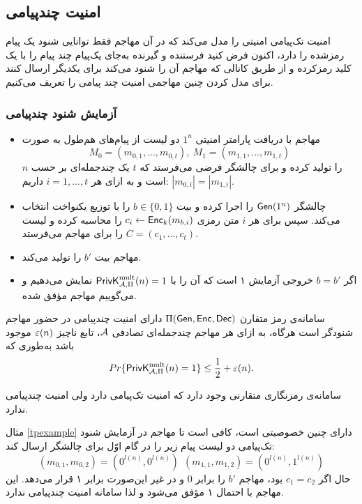 \subsection*{امنیت چند‌پیامی}
امنیت تک‌پیامی امنیتی را مدل می‌کند که در آن مهاجم فقط توانایی شنود یک پیام رمز‌شده را دارد، اکنون فرض کنید فرستنده و گیرنده به‌جای یک‌پیام چند پیام را با یک کلید رمز‌کرده و از طریق کانالی که مهاجم آن را شنود می‌کند برای یکدیگر ارسال کنند برای مدل کردن چنین مهاجمی امنیت چند پیامی را تعریف می‌کنیم.
\subsubsection*{آزمایش شنود چندپیامی}
\begin{itemize}
\item
مهاجم با دریافت پارامتر امنیتی 
$1^{n}$
 دو لیست از پیام‌های هم‌طول به صورت
 $$M_{0} = (m_{0,1}, ..., m_{0, t}), \ M_{1} = (m_{1, 1}, ..., m_{1, t})$$
را تولید کرده و برای چالشگر فرضی می‌فرستد که 
 $t$
 یک چندجمله‌ای بر حسب 
 $n$
  است و به ازای هر 
$i = 1,...,t$
داریم:
$|m_{0, i}|=|m_{1, i}|.$
\item
چالشگر 
$\mathsf{Gen}(1^n)$
را اجرا کرده و  بیت
$b\in\{0, 1\}$
را با توزیع یکنواخت انتخاب می‌کند. سپس  برای هر 
$i$
متن رمزی 
$c_{i}\leftarrow\mathsf{Enc}_{k}(m_{b, i})$
را محاسبه کرده و لیست 
$C = (c_{1}, ..., c_{t})$
را برای مهاجم می‌فرستد.
\item
مهاجم بیت 
$b'$
را تولید می‌کند.
\item
اگر 
$b = b'$
خروجی آزمایش ۱ است که آن را با 
$\mathsf{PrivK}_{\mathcal{A},\Pi}^{\textup{mult}}(n) = 1$
نمایش می‌دهیم و می‌گوییم مهاجم مؤفق شده.
\end{itemize}


 
\begin{definition}
	سامانه‌ی رمز متقارن 
	$\Pi(\mathsf{Gen}, \mathsf{Enc}, \mathsf{Dec})$
	دارای امنیت چندپیامی در حضور مهاجم شنودگر است هرگاه، به ازای هر مهاجم چندجمله‌ای تصادفی
	$\mathcal{A}$، 
	تابع ناچیز
	$\varepsilon(n)$
	موجود باشد به‌طوری که
	$$Pr\{\mathsf{PrivK}_{\mathcal{A},\Pi}^{\textup{mult}}(n) = 1\}\leq \frac{1}{2}+ \varepsilon(n).$$
\end{definition}
\begin{example}
سامانه‌ی رمزنگاری متقارنی وجود دارد که امنیت تک‌پیامی دارد ولی امنیت چندپیامی ندارد.

مثال 
\ref{tpexample}
 دارای چنین خصوصیتی است، کافی است تا مهاجم در آزمایش شنود تک‌پیامی دو لیست پیام زیر را در گام اوّل برای چالشگر ارسال کند:
 $$(m_{0, 1}, m_{0, 2}) = (0^{l(n)}, 0^{l(n)}) \ \ (m_{1, 1}, m_{1, 2}) = (0^{l(n)}, 1^{l(n)})$$
 حال اگر 
 $c_{1} = c_{2}$
 بود، مهاجم 
 $b'$
 را برابر 
 $0$
 و در غیر این‌صورت برابر ۱ قرار می‌دهد. این مهاجم با احتمال ۱ مؤفق می‌شود و لذا سامانه امنیت چند‌پیامی ندارد.
\end{example}
 
